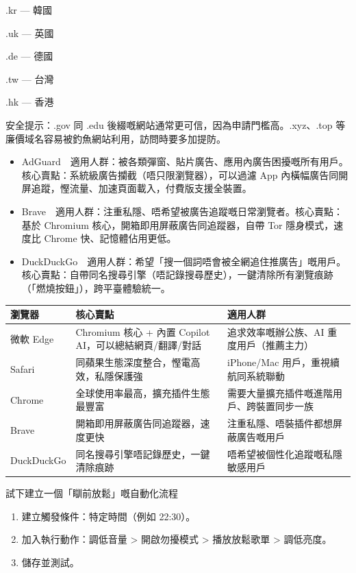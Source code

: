 .kr — 韓國

.uk — 英國

.de — 德國

.tw — 台灣

.hk — 香港

安全提示：.gov 同 .edu 後綴嘅網站通常更可信，因為申請門檻高。.xyz、.top 等廉價域名容易被釣魚網站利用，訪問時要多加提防。


\begin{itemize}
  \item AdGuard　適用人群：被各類彈窗、貼片廣告、應用內廣告困擾嘅所有用戶。核心賣點：系統級廣告攔截（唔只限瀏覽器），可以過濾 App 內橫幅廣告同開屏追蹤，慳流量、加速頁面載入，付費版支援全裝置。
\end{itemize}


\begin{itemize}
  \item Brave　適用人群：注重私隱、唔希望被廣告追蹤嘅日常瀏覽者。核心賣點：基於 Chromium 核心，開箱即用屏蔽廣告同追蹤器，自帶 Tor 隱身模式，速度比 Chrome 快、記憶體佔用更低。
  \item DuckDuckGo　適用人群：希望「搜一個詞唔會被全網追住推廣告」嘅用戶。核心賣點：自帶同名搜尋引擎（唔記錄搜尋歷史），一鍵清除所有瀏覽痕跡（「燃燒按鈕」），跨平臺體驗統一。
\end{itemize}


\begin{center}
\begin{tabularx}{\linewidth}{|X|X|X|}
\hline
\textbf{瀏覽器} & \textbf{核心賣點} & \textbf{適用人群} \tabularnewline
\hline
微軟 Edge & Chromium 核心 + 內置 Copilot AI，可以總結網頁/翻譯/對話 & 追求效率嘅辦公族、AI 重度用戶（推薦主力） \tabularnewline
Safari & 同蘋果生態深度整合，慳電高效，私隱保護強 & iPhone/Mac 用戶，重視續航同系統聯動 \tabularnewline
Chrome & 全球使用率最高，擴充插件生態最豐富 & 需要大量擴充插件嘅進階用戶、跨裝置同步一族 \tabularnewline
Brave & 開箱即用屏蔽廣告同追蹤器，速度更快 & 注重私隱、唔裝插件都想屏蔽廣告嘅用戶 \tabularnewline
DuckDuckGo & 同名搜尋引擎唔記錄歷史，一鍵清除痕跡 & 唔希望被個性化追蹤嘅私隱敏感用戶 \tabularnewline
\hline
\end{tabularx}
\end{center}

\begin{tcbpractice}{試下建立一個「瞓前放鬆」嘅自動化流程}
\begin{enumerate}
  \item 建立觸發條件：特定時間（例如 22:30）。
  \item 加入執行動作：調低音量 > 開啟勿擾模式 > 播放放鬆歌單 > 調低亮度。
  \item 儲存並測試。
\end{enumerate}

\end{tcbpractice}

